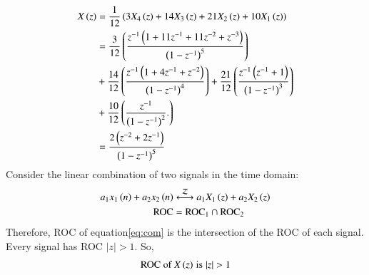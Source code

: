 \documentclass[journal,12pt,twocolumn]{IEEEtran}
\theoremstyle{remark}
\begin{document}
\begin{enumerate}
\begin{align}
\end{align}
\begin{align}
    X\left(z\right) &=\frac{1}{12}\left(3X_4\left(z\right) + 14X_3\left(z\right) + 21X_2\left(z\right) + 10X_1\left(z\right)\right)\label{eq:com} \\
         &= \frac{3}{12}\left(\frac{z^{-1}\left(1+11z^{-1}+11z^{-2}+z^{-3}\right)}{\left(1-z^{-1}\right)^5}\right)\\ &+ \frac{14}{12}\left(\frac{z^{-1}\left(1+4z^{-1}+z^{-2}\right)}{\left(1-z^{-1}\right)^4}\right) 
         + \frac{21}{12}\left(\frac{z^{-1}\left(z^{-1}+1\right)}{\left(1-z^{-1}\right)^3}\right)\notag \\ &+ \frac{10}{12}\left(\frac{z^{-1}}{\left(1-z^{-1}\right)^2}.\right)\notag \\
         &= \frac{2\left(z^{-2}+2z^{-1}\right)}{\left(1-z^{-1}\right)^5}
\end{align}
Consider the linear combination of two signals in the time domain:
\begin{align}
    a_1 x_1\left(n\right) + a_2 x_2\left(n\right) &\stackrel{\mathcal{Z}}{\longleftrightarrow} a_1 X_1\left(z\right) + a_2 X_2\left(z\right) \label{eq:combined_signal}\\
    \text{ROC} &= \text{ROC}_1 \cap \text{ROC}_2 \label{eq:roc_intersection}
\end{align}
Therefore, ROC of equation\eqref{eq:com} is the intersection of the ROC of each signal. Every signal has ROC $|z|>1$. So,
\begin{align}
    \text{ROC of $X\brak{z}$} \text{\hspace{3pt}is\hspace{3pt}} |z|>1
\end{align}


\end{enumerate}
\end{document}
